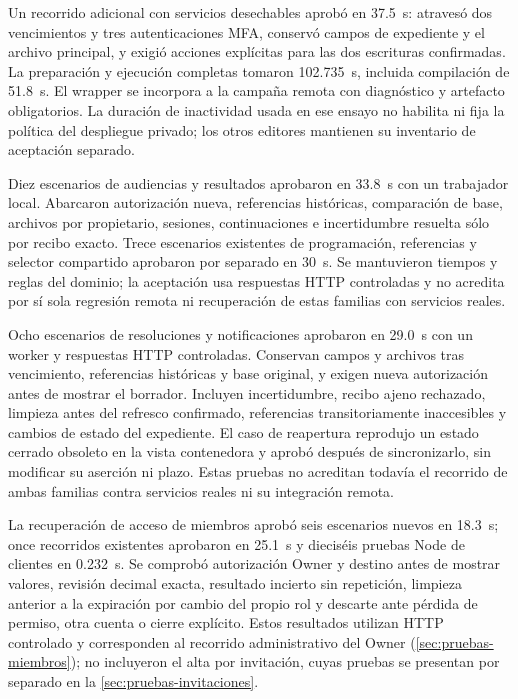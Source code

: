 Un recorrido adicional con servicios desechables aprobó en 37.5~s: atravesó dos
vencimientos y tres autenticaciones MFA, conservó campos de expediente y el archivo
principal, y exigió acciones explícitas para las dos escrituras confirmadas. La
preparación y ejecución completas tomaron 102.735~s, incluida compilación de
51.8~s. El wrapper se incorpora a la campaña remota con diagnóstico y artefacto
obligatorios. La duración de inactividad usada en ese ensayo no habilita ni fija
la política del despliegue privado; los otros editores mantienen su inventario
de aceptación separado.


Diez escenarios de audiencias y resultados aprobaron en 33.8~s con un trabajador
local. Abarcaron autorización nueva, referencias históricas, comparación de base,
archivos por propietario, sesiones, continuaciones e incertidumbre resuelta sólo
por recibo exacto. Trece escenarios existentes de programación, referencias y
selector compartido aprobaron por separado en 30~s. Se mantuvieron tiempos y
reglas del dominio; la aceptación usa respuestas HTTP controladas y no acredita
por sí sola regresión remota ni recuperación de estas familias con servicios reales.


Ocho escenarios de resoluciones y notificaciones aprobaron en 29.0~s con un
worker y respuestas HTTP controladas. Conservan campos y archivos tras
vencimiento, referencias históricas y base original, y exigen nueva autorización
antes de mostrar el borrador. Incluyen incertidumbre, recibo ajeno rechazado,
limpieza antes del refresco confirmado, referencias transitoriamente inaccesibles
y cambios de estado del expediente. El caso de reapertura reprodujo un estado
cerrado obsoleto en la vista contenedora y aprobó después de sincronizarlo,
sin modificar su aserción ni plazo. Estas pruebas no acreditan todavía el
recorrido de ambas familias contra servicios reales ni su integración remota.


La recuperación de acceso de miembros aprobó seis escenarios nuevos en
18.3~s; once recorridos existentes aprobaron en 25.1~s y dieciséis pruebas
Node de clientes en 0.232~s. Se comprobó autorización Owner y destino antes
de mostrar valores, revisión decimal exacta, resultado incierto sin repetición,
limpieza anterior a la expiración por cambio del propio rol y descarte ante
pérdida de permiso, otra cuenta o cierre explícito. Estos resultados utilizan
HTTP controlado y corresponden al recorrido administrativo del Owner
(\cref{sec:pruebas-miembros}); no
incluyeron el alta por invitaci\'on, cuyas pruebas se presentan por separado
en la \cref{sec:pruebas-invitaciones}.


